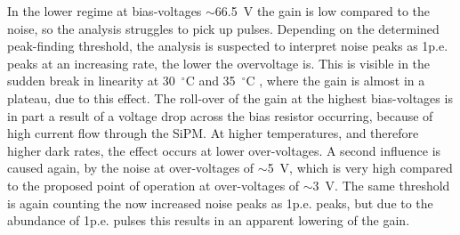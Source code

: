 \documentclass[12pt,article,type=msc,colorback,accentcolor=tud9c]{tudthesis}
\begin{document}
In the lower regime at bias-voltages $\sim$66.5~V the gain is low compared to the noise, so the analysis struggles to pick up pulses. Depending on the determined peak-finding threshold, the analysis is suspected to interpret noise peaks as 1p.e. peaks at an increasing rate, the lower the overvoltage is. This is visible in the sudden break in linearity at 30~$^{\circ}$C and 35~$^{\circ}$C , where the gain is almost in a plateau, due to this effect. The roll-over of the gain at the highest bias-voltages is in part a result of a voltage drop across the bias resistor occurring, because of high current flow through the SiPM. At higher temperatures, and therefore higher dark rates, the effect occurs at lower over-voltages. A second influence is caused again, by the noise at over-voltages of $\sim$5~V, which is very high compared to the proposed point of operation at over-voltages of $\sim$3~V. The same threshold is again counting the now increased noise peaks as 1p.e. peaks, but due to the abundance of 1p.e. pulses this results in an apparent lowering of the gain.



\end{document}
